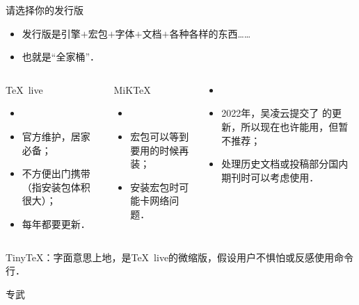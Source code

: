 \begin{frame}{请选择你的发行版}
	\begin{itemize}
		\item 发行版是引擎$+$宏包$+$字体$+$文档$+$各种各样的东西……
		\item 也就是“全家桶”．
	\end{itemize}
	\medskip
	\begin{columns}[t]
		\pause
		\begin{column}{.3\textwidth}
			\huge\TeX{}~live\small
			\begin{itemize}
				\item \faWindows~\faApple~\faLinux
				\item 官方维护，居家必备；
				\item 不方便出门携带（指安装包体积很大）；
				\item 每年都要更新．
			\end{itemize}
		\end{column}
		\pause
		\begin{column}{.3\textwidth}
			\huge MiK\TeX\small
			\begin{itemize}
				\item \faWindows~\faApple~\faLinux
				\item 宏包可以等到要用的时候再装；
				\item 安装宏包时可能卡网络问题．
			\end{itemize}
		\end{column}
		\pause
		\begin{column}{.35\textwidth}
			\huge \CTeX\small
			\begin{itemize}
				\item \faWindows
				\item 2022年，吴凌云提交了 \CTeX{} 的更新，所以现在也许能用，但暂不推荐；
				\item 处理历史文档或投稿部分国内期刊时可以考虑使用．
			\end{itemize}
		\end{column}
	\end{columns}

	\pause\tiny Tiny\TeX{}：字面意思上地，是\TeX{}~live的微缩版，假设用户不惧怕或反感使用命令行．
\end{frame}


\begin{frame}{专武}
    \pause
    \pause
    \pause
\end{frame}

